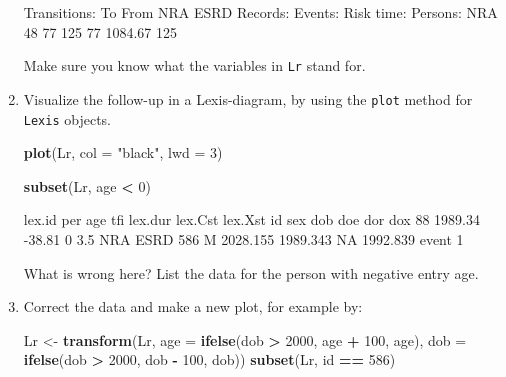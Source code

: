 \documentclass[
]{book}
\newenvironment{Shaded}{\begin{snugshade}}{\end{snugshade}}
\newcommand{\AttributeTok}[1]{\textcolor[rgb]{0.13,0.29,0.53}{#1}}
\newcommand{\DecValTok}[1]{\textcolor[rgb]{0.00,0.00,0.81}{#1}}
\newcommand{\FunctionTok}[1]{\textcolor[rgb]{0.13,0.29,0.53}{\textbf{#1}}}
\newcommand{\NormalTok}[1]{#1}
\newcommand{\OtherTok}[1]{\textcolor[rgb]{0.56,0.35,0.01}{#1}}
\newcommand{\SpecialCharTok}[1]{\textcolor[rgb]{0.81,0.36,0.00}{\textbf{#1}}}
\newcommand{\StringTok}[1]{\textcolor[rgb]{0.31,0.60,0.02}{#1}}
\begin{document}
\begin{enumerate}
\begin{Shaded}
\begin{Highlighting}[]
\NormalTok{Transitions:}
\NormalTok{     To}
\NormalTok{From  NRA ESRD  Records:  Events: Risk time:  Persons:}
\NormalTok{  NRA  48   77       125       77    1084.67       125}
\end{Highlighting}
\end{Shaded}

  Make sure you know what the variables in \texttt{Lr} stand for.
\item
  Visualize the follow-up in a Lexis-diagram, by using the
  \texttt{plot} method for \texttt{Lexis} objects.

\begin{Shaded}
\begin{Highlighting}[]
\FunctionTok{plot}\NormalTok{(Lr, }\AttributeTok{col =} \StringTok{"black"}\NormalTok{, }\AttributeTok{lwd =} \DecValTok{3}\NormalTok{)}
\end{Highlighting}
\end{Shaded}

\begin{Shaded}
\begin{Highlighting}[]
\FunctionTok{subset}\NormalTok{(Lr, age }\SpecialCharTok{\textless{}} \DecValTok{0}\NormalTok{)}
\end{Highlighting}
\end{Shaded}

\begin{Shaded}
\begin{Highlighting}[]
\NormalTok{ lex.id     per    age tfi lex.dur lex.Cst lex.Xst  id sex      dob      doe dor      dox}
\NormalTok{     88 1989.34 {-}38.81   0     3.5     NRA    ESRD 586   M 2028.155 1989.343  NA 1992.839}
\NormalTok{ event}
\NormalTok{     1}
\end{Highlighting}
\end{Shaded}

  What is wrong here? List the data for the person with negative entry age.
\item
  Correct the data and make a new plot, for example by:

\begin{Shaded}
\begin{Highlighting}[]
\NormalTok{Lr }\OtherTok{\textless{}{-}} \FunctionTok{transform}\NormalTok{(Lr, }\AttributeTok{age =} \FunctionTok{ifelse}\NormalTok{(dob }\SpecialCharTok{\textgreater{}} \DecValTok{2000}\NormalTok{, age }\SpecialCharTok{+} \DecValTok{100}\NormalTok{, age),}
                    \AttributeTok{dob =} \FunctionTok{ifelse}\NormalTok{(dob }\SpecialCharTok{\textgreater{}} \DecValTok{2000}\NormalTok{, dob }\SpecialCharTok{{-}} \DecValTok{100}\NormalTok{, dob))}
\FunctionTok{subset}\NormalTok{(Lr, id }\SpecialCharTok{==} \DecValTok{586}\NormalTok{)}
\end{Highlighting}
\end{Shaded}


\end{enumerate}
\end{document}
